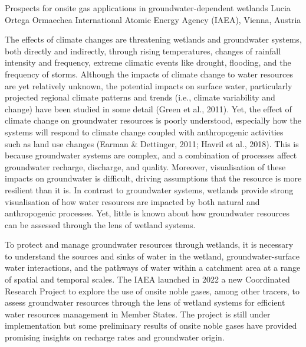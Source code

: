 \begin{conf-abstract}
{Prospects for onsite gas applications in groundwater-dependent wetlands}
{Lucia Ortega Ormaechea}
{International Atomic Energy Agency (IAEA), Vienna, Austria}
{The effects of climate changes are threatening wetlands and groundwater systems, both directly and indirectly, through rising temperatures, changes of rainfall intensity and frequency, extreme climatic events like drought, flooding, and the frequency of storms. Although the impacts of climate change to water resources are yet relatively unknown, the potential impacts on surface water, particularly projected regional climate patterns and trends (i.e., climate variability and change) have been studied in some detail (Green et al., 2011). Yet, the effect of climate change on groundwater resources is poorly understood, especially how the systems will respond to climate change coupled with anthropogenic activities such as land use changes (Earman \& Dettinger, 2011; Havril et al., 2018). This is because groundwater systems are complex, and a combination of processes affect groundwater recharge, discharge, and quality. Moreover, visualisation of these impacts on groundwater is difficult, driving assumptions that the resource is more resilient than it is. In contrast to groundwater systems, wetlands provide strong visualisation of how water resources are impacted by both natural and anthropogenic processes. Yet, little is known about how groundwater resources can be assessed through the lens of wetland systems. 

To protect and manage groundwater resources through wetlands, it is necessary to understand the sources and sinks of water in the wetland, groundwater-surface water interactions, and the pathways of water within a catchment area at a range of spatial and temporal scales. The IAEA launched in 2022 a new Coordinated Research Project to explore the use of onsite noble gases, among other tracers, to assess groundwater resources through the lens of wetland systems for efficient water resources management in Member States. The project is still under implementation but some preliminary results of onsite noble gases have provided promising insights on recharge rates and groundwater origin.}
\end{conf-abstract}
